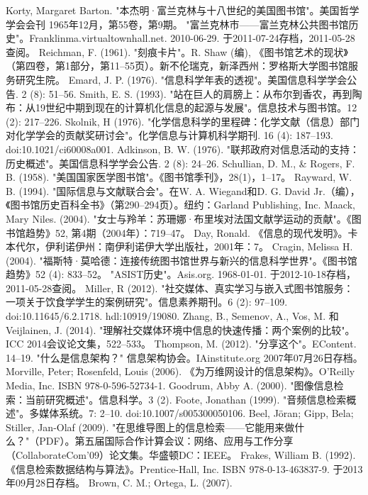 \begin{enumerate}
Korty, Margaret Barton. "本杰明·富兰克林与十八世纪的美国图书馆"。美国哲学学会会刊 1965年12月，第55卷，第9期。  
"富兰克林市——富兰克林公共图书馆历史"。Franklinma.virtualtownhall.net. 2010-06-29. 于2011-07-24存档，2011-05-28查阅。  
Reichman, F. (1961). "刻痕卡片"。R. Shaw (编), 《图书馆艺术的现状》（第四卷，第1部分，第11–55页）。新不伦瑞克，新泽西州：罗格斯大学图书馆服务研究生院。  
Emard, J. P. (1976). "信息科学年表的透视"。美国信息科学学会公告. 2 (8): 51–56.  
Smith, E. S. (1993). "站在巨人的肩膀上：从布尔到香农，再到陶布：从19世纪中期到现在的计算机化信息的起源与发展"。信息技术与图书馆。12 (2): 217–226.  
Skolnik, H (1976). "化学信息科学的里程碑：化学文献（信息）部门对化学学会的贡献奖研讨会"。化学信息与计算机科学期刊. 16 (4): 187–193. doi:10.1021/ci60008a001.  
Adkinson, B. W. (1976). "联邦政府对信息活动的支持：历史概述"。美国信息科学学会公告. 2 (8): 24–26.  
Schullian, D. M., & Rogers, F. B. (1958). "美国国家医学图书馆"。《图书馆季刊》，28(1)，1–17。  
Rayward, W. B. (1994). "国际信息与文献联合会"。在W. A. Wiegand和D. G. David Jr.（编），《图书馆历史百科全书》（第290–294页）。纽约：Garland Publishing, Inc.  
Maack, Mary Niles. (2004). "女士与羚羊：苏珊娜·布里埃对法国文献学运动的贡献"。《图书馆趋势》52, 第4期（2004年）：719–47。  
Day, Ronald. 《信息的现代发明》。卡本代尔，伊利诺伊州：南伊利诺伊大学出版社，2001年：7。  
Cragin, Melissa H. (2004). "福斯特·莫哈德：连接传统图书馆世界与新兴的信息科学世界"。《图书馆趋势》52 (4): 833–52。  
"ASIST历史"。Asis.org. 1968-01-01. 于2012-10-18存档，2011-05-28查阅。  
Miller, R (2012). "社交媒体、真实学习与嵌入式图书馆服务：一项关于饮食学学生的案例研究"。信息素养期刊。6 (2): 97–109. doi:10.11645/6.2.1718. hdl:10919/19080.  
Zhang, B., Semenov, A., Vos, M. 和 Veijlainen, J. (2014). "理解社交媒体环境中信息的快速传播：两个案例的比较"。ICC 2014会议论文集，522–533。  
Thompson, M. (2012). "分享这个"。EContent. 14–19.  
"什么是信息架构？" 信息架构协会。IAinstitute.org 2007年07月26日存档。  
Morville, Peter; Rosenfeld, Louis (2006). 《为万维网设计的信息架构》。O'Reilly Media, Inc. ISBN 978-0-596-52734-1.  
Goodrum, Abby A. (2000). "图像信息检索：当前研究概述"。信息科学。3 (2).  
Foote, Jonathan (1999). "音频信息检索概述"。多媒体系统。7: 2–10. doi:10.1007/s005300050106.  
Beel, Jöran; Gipp, Bela; Stiller, Jan-Olaf (2009). "在思维导图上的信息检索——它能用来做什么？"（PDF）。第五届国际合作计算会议：网络、应用与工作分享（CollaborateCom'09）论文集。华盛顿DC：IEEE。  
Frakes, William B. (1992). 《信息检索数据结构与算法》。Prentice-Hall, Inc. ISBN 978-0-13-463837-9. 于2013年09月28日存档。  
Brown, C. M.; Ortega, L. (2007). 
\end{enumerate}